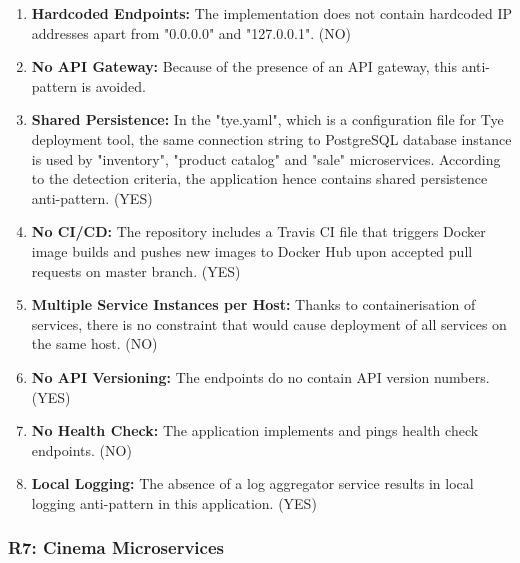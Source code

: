 \documentclass{Configuration_Files/PoliMi3i_thesis}
\begin{document}
\begin{enumerate}
    \item \textbf{Hardcoded Endpoints:} The implementation does not contain hardcoded IP addresses apart from "0.0.0.0" and "127.0.0.1". (NO)
    
    \item \textbf{No API Gateway:} Because of the presence of an API gateway, this anti-pattern is avoided.
    
    \item \textbf{Shared Persistence:} In the "tye.yaml", which is a configuration file for Tye deployment tool, the same connection string to PostgreSQL database instance is used by "inventory", "product catalog" and "sale" microservices.
    According to the detection criteria, the application hence contains shared persistence anti-pattern. (YES)
    
    \item \textbf{No CI/CD:} The repository includes a Travis CI file that triggers Docker image builds and pushes new images to Docker Hub upon accepted pull requests on master branch. (YES)
    
    \item \textbf{Multiple Service Instances per Host:} Thanks to containerisation of services, there is no constraint that would cause deployment of all services on the same host. (NO)
    
    \item \textbf{No API Versioning:} The endpoints do no contain API version numbers. (YES)
    
    \item \textbf{No Health Check:} The application implements and pings health check endpoints. (NO)
    
    \item \textbf{Local Logging:} The absence of a log aggregator service results in local logging anti-pattern in this application. (YES)
\end{enumerate}

\subsubsection{R7: Cinema Microservices}
\label{subsubsec:R7}
\end{document}
